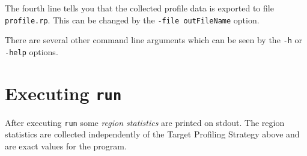 \documentclass[12pt]{book}
\begin{document}
The fourth line tells you that the collected profile data is exported to
file \texttt{profile.rp}. This can be changed by the 
\texttt{-file outFileName} option.

There are several other command line arguments which can be seen by the
\texttt{-h} or \texttt{-help} options.

\section{Executing \texttt{run}}
After executing \texttt{run} some \emph{region statistics} are printed on
stdout. The region statistics are collected independently of the Target
Profiling Strategy above and are exact values for the program.
\end{document}
